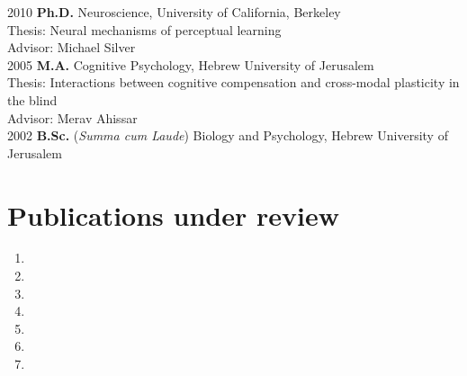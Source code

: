 \documentclass[11pt,fullpage]{article}
\newcommand\tab[1][1cm]{\hspace*{#1}}
\begin{document}
	2010  {\bf Ph.D. } Neuroscience, University of California, Berkeley \\
     \tab Thesis: Neural mechanisms of perceptual learning\\
     \tab Advisor: Michael Silver \\
	2005  {\bf M.A.} Cognitive Psychology, Hebrew University of Jerusalem \\
      \tab Thesis: Interactions between cognitive compensation and cross-modal plasticity in the blind \\
      \tab Advisor: Merav Ahissar \\
	2002  {\bf B.Sc.} (\emph{Summa cum Laude}) Biology and Psychology, Hebrew University of Jerusalem \\


\section*{Publications under review}
\begin{enumerate}
\item {}
\item {}
\item {}
\item {}
\item {}
\item {}
\item {}
\end{enumerate}
\end{document}
